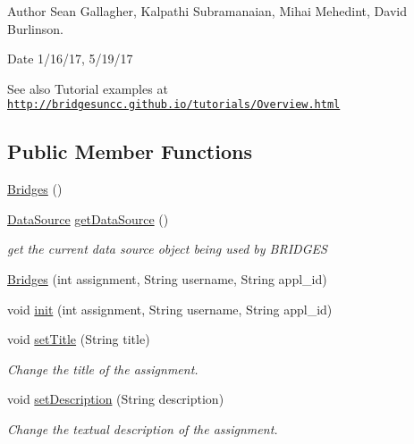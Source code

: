 \begin{DoxyAuthor}{Author}
Sean Gallagher, Kalpathi Subramanaian, Mihai Mehedint, David Burlinson.
\end{DoxyAuthor}
\begin{DoxyDate}{Date}
1/16/17, 5/19/17
\end{DoxyDate}
\begin{DoxySeeAlso}{See also}
Tutorial examples at ~\newline
 \href{http://bridgesuncc.github.io/tutorials/Overview.html}{\tt http\+://bridgesuncc.\+github.\+io/tutorials/\+Overview.\+html} 
\end{DoxySeeAlso}
\subsection*{Public Member Functions}
\begin{DoxyCompactItemize}
\item 
\hyperlink{classbridges_1_1connect_1_1_bridges_a42f0592841a829f93453506c78951b1f}{Bridges} ()
\item 
\hyperlink{classbridges_1_1connect_1_1_data_source}{Data\+Source} \hyperlink{classbridges_1_1connect_1_1_bridges_acfe00a832969a77504d9d33d783c4fcd}{get\+Data\+Source} ()
\begin{DoxyCompactList}\small\item\em get the current data source object being used by B\+R\+I\+D\+G\+ES \end{DoxyCompactList}\item 
\hyperlink{classbridges_1_1connect_1_1_bridges_a4c47eb7cbb94c5810dc38c38760db872}{Bridges} (int assignment, String username, String appl\+\_\+id)
\item 
void \hyperlink{classbridges_1_1connect_1_1_bridges_a87aa73367a43cfc8b3ae5e4926ea4895}{init} (int assignment, String username, String appl\+\_\+id)
\item 
void \hyperlink{classbridges_1_1connect_1_1_bridges_aed3752ee6318a48dff271d9a9e2a8fcc}{set\+Title} (String title)
\begin{DoxyCompactList}\small\item\em Change the title of the assignment. \end{DoxyCompactList}\item 
void \hyperlink{classbridges_1_1connect_1_1_bridges_a50d1d5aa64d312393b63d1be854e34a2}{set\+Description} (String description)
\begin{DoxyCompactList}\small\item\em Change the textual description of the assignment. \end{DoxyCompactList}\item 

\end{DoxyCompactItemize}
